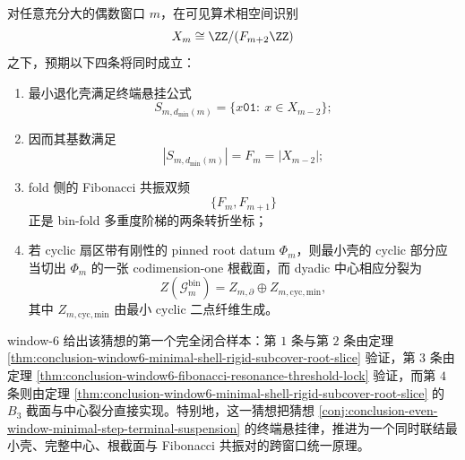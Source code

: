 



\begin{conjecture}\label{conj:conclusion-even-window-subcover-center-resonance-lock}
对任意充分大的偶数窗口 \(m\)，在可见算术相空间识别
\[
X_m\cong \ZZ/(F_{m+2}\ZZ)
\]
之下，预期以下四条将同时成立：
\begin{enumerate}
  \item 最小退化壳满足终端悬挂公式
  \[
  S_{m,d_{\min}(m)}
  =
  \{x\mathtt{01}:\ x\in X_{m-2}\};
  \]
  \item 因而其基数满足
  \[
  |S_{m,d_{\min}(m)}|=F_m=|X_{m-2}|;
  \]
  \item fold 侧的 Fibonacci 共振双频
  \[
  \{F_m,F_{m+1}\}
  \]
  正是 bin-fold 多重度阶梯的两条转折坐标；
  \item 若 cyclic 扇区带有刚性的 pinned root datum \(\Phi_m\)，则最小壳的 cyclic 部分应当切出 \(\Phi_m\) 的一张 codimension-one 根截面，而 dyadic 中心相应分裂为
  \[
  Z(\mathcal G_m^{\mathrm{bin}})
  =
  Z_{m,\partial}\oplus Z_{m,\mathrm{cyc,min}},
  \]
  其中 \(Z_{m,\mathrm{cyc,min}}\) 由最小 cyclic 二点纤维生成。
\end{enumerate}
window-\(6\) 给出该猜想的第一个完全闭合样本：第 \(1\) 条与第 \(2\) 条由定理 \ref{thm:conclusion-window6-minimal-shell-rigid-subcover-root-slice} 验证，第 \(3\) 条由定理 \ref{thm:conclusion-window6-fibonacci-resonance-threshold-lock} 验证，而第 \(4\) 条则由定理 \ref{thm:conclusion-window6-minimal-shell-rigid-subcover-root-slice} 的 \(B_3\) 截面与中心裂分直接实现。特别地，这一猜想把猜想 \ref{conj:conclusion-even-window-minimal-step-terminal-suspension} 的终端悬挂律，推进为一个同时联结最小壳、完整中心、根截面与 Fibonacci 共振对的跨窗口统一原理。
\end{conjecture}

